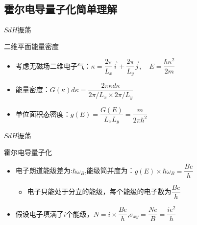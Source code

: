 \documentclass{beamer}
\begin{document}
\subsection{霍尔电导量子化简单理解}
\begin{frame}{$SdH$振荡}
	\begin{block}{二维平面能量密度}
		\begin{itemize}
			\item 考虑无磁场二维电子气：$\kappa=\dfrac{2\pi}{L_{x}}\vec{i}+\dfrac{2\pi}{L_{y}}\vec{j},\quad E=\dfrac{\hbar \kappa^{2}}{2m}$
			\item 能量密度：$G(\kappa)d\kappa=\dfrac{2\pi\kappa d\kappa}{2\pi/L_{x}\times2\pi/L_{y}}$
			\item 单位面积态密度：$g(E)=\dfrac{G(E)}{L_{x}L_{y}}=\dfrac{m}{2\pi\hbar^{2}}$
		\end{itemize}
	\end{block}

\end{frame}
\begin{frame}{$SdH$振荡}
\begin{block}{霍尔电导量子化}
	\begin{itemize}
		\item 电子朗道能级差为:$\hbar\omega_{B}$,能级简并度为：$g(E)\times \hbar\omega_{B}=\dfrac{Be}{h}$
		\begin{itemize}
			\item 电子只能处于分立的能级，每个能级的电子数为$\dfrac{Be}{h}$
		\end{itemize}
		\item 假设电子填满了$i$个能级，$N=i\times \dfrac{Be}{h}$,\quad$\sigma_{xy}=\dfrac{Ne}{B}=\dfrac{ie^{2}}{h}$
	\end{itemize}
\end{block}	
\end{frame}
\end{document}
